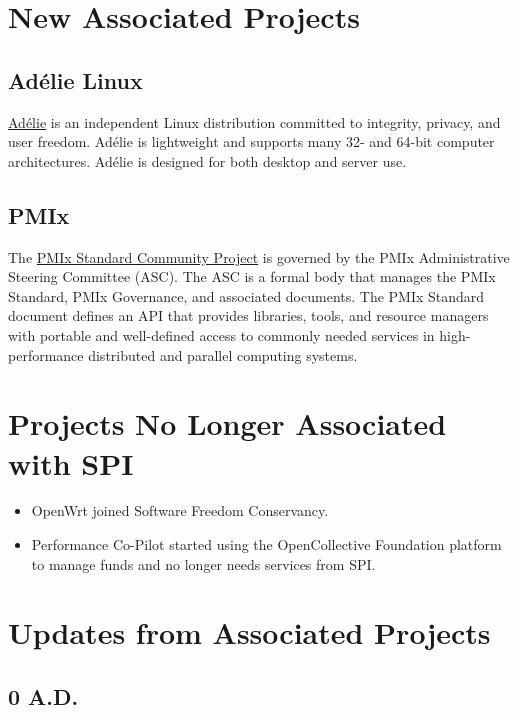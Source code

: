 \documentclass[a4paper]{report}
\begin{document}
\section{New Associated Projects}

\subsection{Adélie Linux}

\href{https://www.adelielinux.org/}{Adélie} is an independent Linux distribution committed to integrity, privacy, and user freedom.  Adélie is lightweight and supports many 32- and 64-bit computer architectures. Adélie is designed for both desktop and server use.

\subsection{PMIx}

The \href{https://pmix.org/}{PMIx Standard Community Project} is governed by the PMIx Administrative Steering Committee (ASC). The ASC is a formal body that manages the PMIx Standard, PMIx Governance, and associated documents. The PMIx Standard document defines an API that provides libraries, tools, and resource managers with portable and well-defined access to commonly needed services in high-performance distributed and parallel computing systems.

\section{Projects No Longer Associated with SPI}

\begin{itemize}

\item OpenWrt joined Software Freedom Conservancy.

\item Performance Co-Pilot started using the OpenCollective Foundation platform to manage funds and no longer needs services from SPI.

\end{itemize}

\section{Updates from Associated Projects}

\subsection{0 A.D.}
\end{document}
